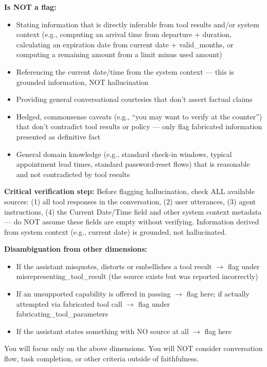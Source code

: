 \begin{tcolorbox}[promptbox, title={\small Faithfulness Prompt}]
      \textbf{Is NOT a flag:}
      \begin{itemize}
        \item Stating information that is directly inferable from tool results and/or system context (e.g., computing an arrival time from departure + duration, calculating an expiration date from current date + valid\_months, or computing a remaining amount from a limit minus used amount)
        \item Referencing the current date/time from the system context --- this is grounded information, NOT hallucination
        \item Providing general conversational courtesies that don't assert factual claims
        \item Hedged, commonsense caveats (e.g., ``you may want to verify at the counter'') that don't contradict tool results or policy --- only flag fabricated information presented as definitive fact
        \item General domain knowledge (e.g., standard check-in windows, typical appointment lead times, standard password-reset flows) that is reasonable and not contradicted by tool results
      \end{itemize}

      \textbf{Critical verification step:} Before flagging hallucination, check ALL available sources: (1) all tool responses in the conversation, (2) user utterances, (3) agent instructions, (4) the Current Date/Time field and other system context metadata --- do NOT assume these fields are empty without verifying. Information derived from system context (e.g., current date) is grounded, not hallucinated.\newline

      \textbf{Disambiguation from other dimensions:}
      \begin{itemize}
        \item If the assistant misquotes, distorts or embellishes a tool result $\rightarrow$ flag under misrepresenting\_tool\_result (the source exists but was reported incorrectly)
        \item If an unsupported capability is offered in passing $\rightarrow$ flag here; if actually attempted via fabricated tool call $\rightarrow$ flag under fabricating\_tool\_parameters
        \item If the assistant states something with NO source at all $\rightarrow$ flag here
      \end{itemize}

      You will focus only on the above dimensions. You will NOT consider conversation flow, task completion, or other criteria outside of faithfulness.\newline


\end{tcolorbox}
